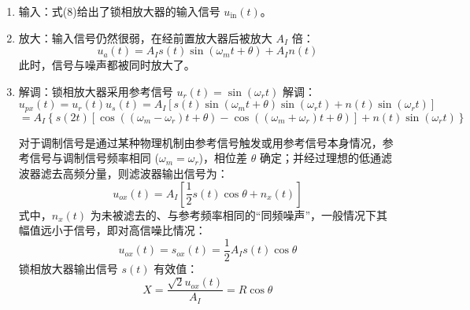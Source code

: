 \documentclass[dvipsnames, svgnames,a4paper,11pt]{article}
\begin{document}
\begin{enumerate}
    \item 输入：式(8)给出了锁相放大器的输入信号 \(u_{\text{in}}(t)\)。
    \item 放大：输入信号仍然很弱，在经前置放大器后被放大 \(A_I\) 倍：
    \begin{equation}
        u_a(t) = A_I s(t) \sin (\omega_m t + \theta) + A_I n(t)
    \end{equation}
    此时，信号与噪声都被同时放大了。
    \item 解调：锁相放大器采用参考信号 \(u_r(t) = \sin (\omega_r t)\) 解调：
    \begin{equation}
        u_{px}(t) = u_r(t) u_s(t) = A_I [s(t) \sin (\omega_m t + \theta) \sin (\omega_r t) + n(t) \sin (\omega_r t)]
    \end{equation}
    \[
        = A_I \left\{s(2t) \left[\cos ((\omega_m - \omega_r) t + \theta) - \cos ((\omega_m + \omega_r) t + \theta)\right] + n(t) \sin (\omega_r t)\right\}
    \]

    对于调制信号是通过某种物理机制由参考信号触发或用参考信号本身情况，参考信号与调制信号频率相同 (\(\omega_m = \omega_r\))，相位差 \(\theta\) 确定；并经过理想的低通滤波器滤去高频分量，则滤波器输出信号为：
    \begin{equation}
        u_{ox}(t) = A_I \left[\frac{1}{2} s(t) \cos \theta + n_x(t)\right]
    \end{equation}
    式中，\(n_x(t)\) 为未被滤去的、与参考频率相同的“同频噪声”，一般情况下其幅值远小于信号，即对高信噪比情况：
    \begin{equation}
        u_{ox}(t) = s_{ox}(t) = \frac{1}{2} A_I s(t) \cos \theta
    \end{equation}
    锁相放大器输出信号 \(s(t)\) 有效值：
    \begin{equation}
        X = \frac{\sqrt{2} u_{ox}(t)}{A_I} = R \cos \theta
    \end{equation}


\end{enumerate}
\end{document}
